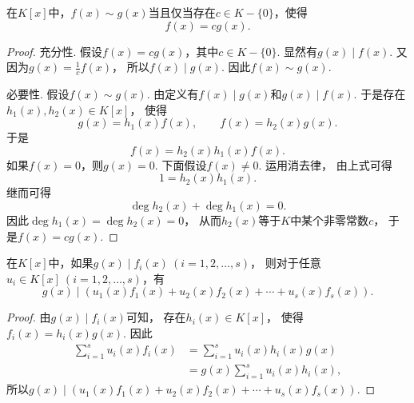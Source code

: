 \begin{proposition}
在\(K[x]\)中，\(f(x) \sim g(x)\)当且仅当存在\(c \in K-\{0\}\)，使得\[
	f(x) = c g(x).
\]
\begin{proof}
充分性.
假设\(f(x)=c g(x)\)，其中\(c \in K-\{0\}\).
显然有\(g(x) \mid f(x)\).
又因为\(g(x)=\frac1c f(x)\)，
所以\(f(x) \mid g(x)\).
因此\(f(x) \sim g(x)\).

必要性.
假设\(f(x) \sim g(x)\).
由定义有\(f(x) \mid g(x)\)和\(g(x) \mid f(x)\).
于是存在\(h_1(x),h_2(x) \in K[x]\)，
使得\[
	g(x) = h_1(x) f(x), \qquad
	f(x) = h_2(x) g(x).
\]
于是\[
	f(x) = h_2(x) h_1(x) f(x).
\]
如果\(f(x)=0\)，则\(g(x)=0\).
下面假设\(f(x)\neq0\).
运用消去律，
由上式可得\[
	1 = h_2(x) h_1(x).
\]
继而可得\[
	\deg h_2(x) + \deg h_1(x) = 0.
\]
因此\(\deg h_1(x) = \deg h_2(x) = 0\)，
从而\(h_2(x)\)等于\(K\)中某个非零常数\(c\)，
于是\(f(x) = c g(x)\).
\end{proof}
\end{proposition}

\begin{proposition}
在\(K[x]\)中，如果\(g(x) \mid f_i(x)\ (i=1,2,\dotsc,s)\)，
则对于任意\(u_i \in K[x]\ (i=1,2,\dotsc,s)\)，有\[
	g(x) \mid (u_1(x) f_1(x) + u_2(x) f_2(x) + \dotsb + u_s(x) f_s(x)).
\]
\begin{proof}
由\(g(x) \mid f_i(x)\)可知，
存在\(h_i(x) \in K[x]\)，
使得\(f_i(x) = h_i(x) g(x)\).
因此\begin{align*}
	\sum_{i=1}^s u_i(x) f_i(x)
	&= \sum_{i=1}^s u_i(x) h_i(x) g(x) \\
	&= g(x) \sum_{i=1}^s u_i(x) h_i(x),
\end{align*}
所以\(g(x) \mid (u_1(x) f_1(x) + u_2(x) f_2(x) + \dotsb + u_s(x) f_s(x))\).
\end{proof}
\end{proposition}

